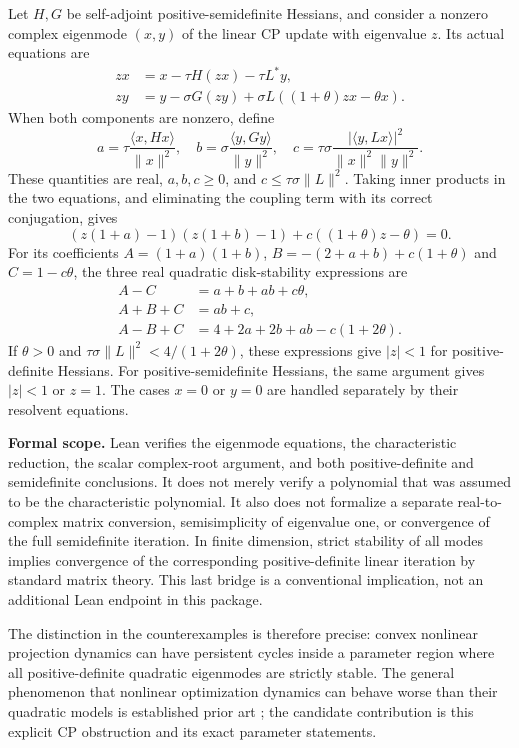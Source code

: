 \documentclass[11pt]{article}
\theoremstyle{remark}\newtheorem{remark}[theorem]{Remark}
\newcommand{\ip}[2]{\langle #1,#2\rangle}
\newcommand{\norm}[1]{\lVert #1\rVert}
\begin{document}
Let $H,G$ be self-adjoint positive-semidefinite Hessians, and consider a nonzero complex eigenmode $(x,y)$ of the linear CP update with eigenvalue $z$. Its actual equations are
\begin{align*}
 zx&=x-\tau H(zx)-\tau L^*y,\\
 zy&=y-\sigma G(zy)+\sigma L((1+\theta)zx-\theta x).
\end{align*}
When both components are nonzero, define
\[
 a=\tau\frac{\ip{x}{Hx}}{\norm x^2},\quad
 b=\sigma\frac{\ip{y}{Gy}}{\norm y^2},\quad
 c=\tau\sigma\frac{|\ip{y}{Lx}|^2}{\norm x^2\norm y^2}.
\]
These quantities are real, $a,b,c\ge0$, and $c\le\tau\sigma\norm L^2$. Taking inner products in the two equations, and eliminating the coupling term with its correct conjugation, gives
\begin{equation}\label{eq:quadratic}
 (z(1+a)-1)(z(1+b)-1)+c((1+\theta)z-\theta)=0.
\end{equation}
For its coefficients $A=(1+a)(1+b)$, $B=-(2+a+b)+c(1+\theta)$ and $C=1-c\theta$, the three real quadratic disk-stability expressions are
\begin{align*}
 A-C&=a+b+ab+c\theta,\\
 A+B+C&=ab+c,\\
 A-B+C&=4+2a+2b+ab-c(1+2\theta).
\end{align*}
If $\theta>0$ and $\tau\sigma\norm L^2<4/(1+2\theta)$, these expressions give $|z|<1$ for positive-definite Hessians. For positive-semidefinite Hessians, the same argument gives $|z|<1$ or $z=1$. The cases $x=0$ or $y=0$ are handled separately by their resolvent equations.

\textbf{Formal scope.} Lean verifies the eigenmode equations, the characteristic reduction, the scalar complex-root argument, and both positive-definite and semidefinite conclusions. It does not merely verify a polynomial that was assumed to be the characteristic polynomial. It also does not formalize a separate real-to-complex matrix conversion, semisimplicity of eigenvalue one, or convergence of the full semidefinite iteration. In finite dimension, strict stability of all modes implies convergence of the corresponding positive-definite linear iteration by standard matrix theory. This last bridge is a conventional implication, not an additional Lean endpoint in this package.

The distinction in the counterexamples is therefore precise: convex nonlinear projection dynamics can have persistent cycles inside a parameter region where all positive-definite quadratic eigenmodes are strictly stable. The general phenomenon that nonlinear optimization dynamics can behave worse than their quadratic models is established prior art \cite{Cycles,SeilerCarrasco}; the candidate contribution is this explicit CP obstruction and its exact parameter statements.
\end{document}
